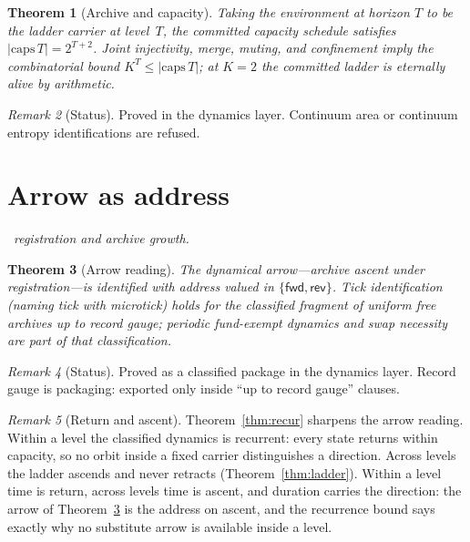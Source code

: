 \documentclass[11pt,a4paper]{article}
\theoremstyle{plain}
\newtheorem{theorem}{Theorem}[section]
\theoremstyle{definition}
\theoremstyle{remark}
\newtheorem{remark}[theorem]{Remark}
\newcommand{\dep}[1]{%
  \par\noindent{\small\color{muted}\sffamily Dependence:}~\textit{#1}\par\medskip}
\begin{document}
\begin{theorem}[Archive and capacity]
\label{thm:caps}
Taking the environment at horizon $T$ to be the ladder carrier at
level~$T$, the committed capacity schedule satisfies
$|\mathrm{caps}\,T|=2^{T+2}$. Joint injectivity, merge, muting, and
confinement imply the combinatorial bound $K^{T}\le|\mathrm{caps}\,T|$;
at $K=2$ the committed ladder is eternally alive by arithmetic.
\end{theorem}

\begin{remark}[Status]
Proved in the dynamics layer. Continuum area or continuum entropy
identifications are refused.
\end{remark}


\section{Arrow as address}
\label{sec:arrow}

\dep{registration and archive growth.}

\begin{theorem}[Arrow reading]
\label{thm:arrow}
The dynamical arrow---archive ascent under registration---is identified
with address valued in $\{\mathsf{fwd},\mathsf{rev}\}$. Tick identification
(naming tick with microtick) holds for the classified fragment of
uniform free archives up to record gauge; periodic fund-exempt dynamics
and swap necessity are part of that classification.
\end{theorem}

\begin{remark}[Status]
Proved as a classified package in the dynamics layer. Record gauge is
packaging: exported only inside ``up to record gauge'' clauses.
\end{remark}

\begin{remark}[Return and ascent]
\label{rem:returnascent}
Theorem~\ref{thm:recur} sharpens the arrow reading. Within a level the
classified dynamics is recurrent: every state returns within capacity,
so no orbit inside a fixed carrier distinguishes a direction. Across
levels the ladder ascends and never retracts
(Theorem~\ref{thm:ladder}). Within a level time is return, across
levels time is ascent, and duration carries the direction: the arrow
of Theorem~\ref{thm:arrow} is the address on ascent, and the
recurrence bound says exactly why no substitute arrow is available
inside a level.
\end{remark}
\end{document}
